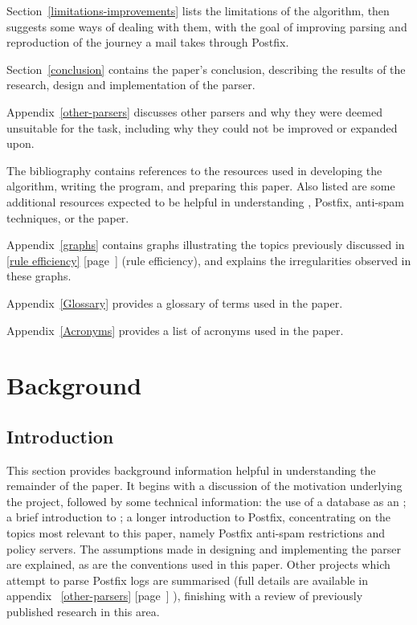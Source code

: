 \documentclass[a4paper,12pt,draft]{article}
\newcommand{\refwithpage}[1]{%
    \empty{}\ref{#1} [page~\pageref{#1}]%
}
\newcommand{\sectionref}[1]{%
    \textsection{}\refwithpage{#1}%
}
\begin{document}
Section~\ref{limitations-improvements} lists the limitations of the
algorithm, then suggests some ways of dealing with them, with the goal of
improving parsing and reproduction of the journey a mail takes through
Postfix.

Section~\ref{conclusion} contains the paper's conclusion, describing the
results of the research, design and implementation of the parser.

Appendix~\ref{other-parsers} discusses other parsers and why they were
deemed unsuitable for the task, including why they could not be improved or
expanded upon.

The bibliography contains references to the resources used in developing
the algorithm, writing the program, and preparing this paper.  Also listed
are some additional resources expected to be helpful in understanding
\SMTP{}, Postfix, anti-spam techniques, or the paper.

Appendix~\ref{graphs} contains graphs illustrating the topics previously
discussed in \sectionref{rule efficiency} (rule efficiency), and explains
the irregularities observed in these graphs.

Appendix~\ref{Glossary} provides a glossary of terms used in the paper.

Appendix~\ref{Acronyms} provides a list of acronyms used in the paper.

\section{Background}

\label{background}

\subsection{Introduction}

This section provides background information helpful in understanding the
remainder of the paper.  It begins with a discussion of the motivation
underlying the project, followed by some technical information: the use of
a database as an \API{}\@; a brief introduction to \SMTP{}\@; a longer
introduction to Postfix, concentrating on the topics most relevant to this
paper, namely Postfix anti-spam restrictions and policy servers.  The
assumptions made in designing and implementing the parser are explained, as
are the conventions used in this paper.  Other projects which attempt to
parse Postfix logs are summarised (full details are available in
appendix~\refwithpage{other-parsers}), finishing with a review of
previously published research in this area.
\end{document}
